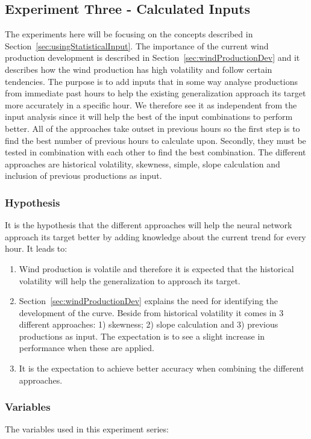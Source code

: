 \newpage

\subsection{Experiment Three - Calculated Inputs}
The experiments here will be focusing on the concepts described in Section~\ref{sec:usingStatisticalInput}. The importance of the current wind production development is described in Section~\ref{sec:windProductionDev} and it describes how the wind production has high volatility and follow certain tendencies. The purpose is to add inputs that in some way analyse productions from immediate past hours to help the existing generalization approach its target more accurately in a specific hour. We therefore see it as independent from the input analysis since it will help the best of the input combinations to perform better. All of the approaches take outset in previous hours so the first step is to find the best number of previous hours to calculate upon. Secondly, they must be tested in combination with each other to find the best combination. The different approaches are historical volatility, skewness, simple, slope calculation and inclusion of previous productions as input. 

\subsubsection{Hypothesis} 
It is the hypothesis that the different approaches will help the neural network approach its target better by adding knowledge about the current trend for every hour. It leads to: 

\begin{enumerate}
\item Wind production is volatile and therefore it is expected that the historical volatility will help the generalization to approach its target.
\item Section~\ref{sec:windProductionDev} explains the need for identifying the development of the curve. Beside from historical volatility it comes in 3 different approaches: 1) skewness; 2) slope calculation and 3) previous productions as input. The expectation is to see a slight increase in performance when these are applied.
\item It is the expectation to achieve better accuracy when combining the different approaches.
\end{enumerate}

\subsubsection{Variables}
The variables used in this experiment series:

